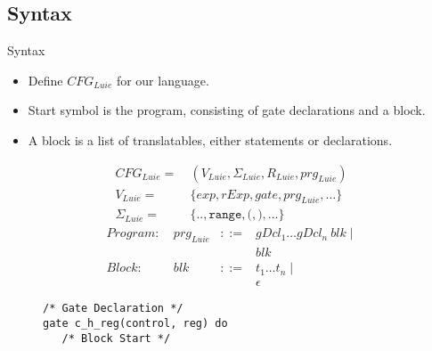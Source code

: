 \subsection{Syntax}
\begin{frame}[fragile]{Syntax}
    \begin{minipage}{.45\textwidth}
        \begin{itemize}
            \item Define $CFG_{Luie}$ for our language.
            \item Start symbol is the program, consisting of gate declarations and a block.
            \item A block is a list of translatables, either statements or declarations.
        \end{itemize}
        \vfill
        \Large
        \begin{align*}
            CFG_{Luie} = \ & (V_{Luie}, \Sigma_{Luie}, R_{Luie}, prg_{Luie} )\\ 
            V_{Luie} = \ & \{ exp, rExp, gate, prg_{Luie}, \dots \}\\ 
            \Sigma_{Luie} = \ & \{\texttt{..}, \texttt{range}, \texttt{(}, \texttt{)}, \dots \} 
        \end{align*}
        \vspace{\alignmargin}
        \begin{align*}
            Program: \ & prg_{Luie} &::=& gDcl_1 \dots gDcl_n \ blk \mid \\
                       &            &   & blk \\
            Block: \ & blk &::=&  t_1 \dots t_n \mid \\
                       &       &&  \epsilon
        \end{align*}
    \end{minipage}
    \begin{minipage}{.50\textwidth}
        \begin{figure}[htp]
            \centering     
            \begin{lstlisting}[style=Luie, basicstyle=\ttfamily\large]
/* Gate Declaration */
gate c_h_reg(control, reg) do
   /* Block Start */


\end{lstlisting}
\end{figure}
\end{minipage}
\end{frame}

